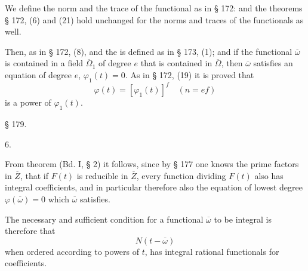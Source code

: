 

We define the norm and the trace of the functional as in § 172:
and the theorems § 172, (6) and (21) hold unchanged for the norms and traces of the functionals as well.

Then, as in § 172, (8),
and the  is defined as in § 173, (1); and if the functional $\overline{\omega}$ is contained in a field $\overline{\Omega}_1$ of degree $e$ that is contained in $\overline{\Omega}$, then $\overline{\omega}$ satisfies an equation of degree $e$, $\varphi_1(t) = 0$. As in § 172, (19) it is proved that
\[
\varphi(t) = [\varphi_1(t)]^f \quad (n = ef)
\]
is a power of $\varphi_1(t)$.

\begin{center}
§ 179.\\
\end{center}

6. 

From  theorem (Bd. I, § 2) it follows, since by § 177 one knows the prime factors in $\overline{Z}$, that if $F(t)$ is reducible in $\overline{Z}$, every function dividing $F(t)$ also has integral coefficients, and in particular therefore also the equation of lowest degree $\varphi(\overline{\omega}) = 0$ which $\overline{\omega}$ satisfies.

The necessary and sufficient condition for a functional $\overline{\omega}$ to be integral is therefore that
\[
N(t - \overline{\omega})
\]
when ordered according to powers of $t$, has integral rational functionals for coefficients.
